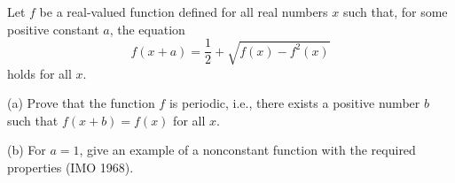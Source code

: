 Let $f$ be a real-valued function defined for all real numbers $x$ such that, for some positive constant $a$, the equation
\[ f(x + a) = \frac{1}{2} + \sqrt{f(x) - f^2(x)} \]
holds for all $x$.

(a) Prove that the function $f$ is periodic, i.e., there exists a positive number $b$ such that $f(x + b) = f(x)$ for all $x$.

(b) For $a = 1$, give an example of a nonconstant function with the required properties (IMO 1968).

